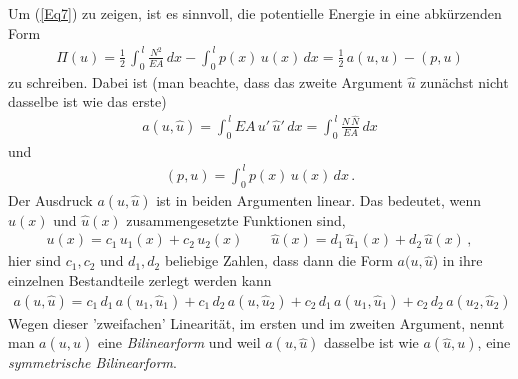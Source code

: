 Um (\ref{Eq7}) zu zeigen, ist es sinnvoll, die potentielle Energie in eine abk\"{u}rzenden Form
\begin{align}
\Pi(u) = \frac{1}{2}\, \int_0^{\,l} \frac{N^2}{EA}\,dx - \int_0^{\,l} p(x)\,u(x)\,dx = \frac{1}{2}\, a(u,u) - (p,u)
\end{align}
zu schreiben. Dabei ist (man beachte, dass das zweite Argument $\hat{u}$ zun\"{a}chst nicht dasselbe ist wie das erste)
\begin{align}
a(u,\hat{u}) = \int_0^{\,l} EA\,u'\,\hat{u}'\,dx = \int_0^{\,l} \frac{N\,\hat{N}}{EA}\,dx
\end{align}
und
\begin{align}
(p,u) = \int_0^{\,l} p(x)\,u(x)\,dx\,.
\end{align}
Der Ausdruck $a(u,\hat{u})$ ist in beiden Argumenten linear. Das bedeutet, wenn $ u(x) $ und $ \hat{u}(x)$ zusammengesetzte Funktionen sind,
\begin{align}
u(x)= c_1\,u_1(x) + c_2\,u_2(x) \qquad \hat{u}(x) = d_1\,\hat{u}_1(x) + d_2\,\hat{u}(x)\,,
\end{align}
hier sind $c_1, c_2$ und $d_1, d_2$  beliebige Zahlen, dass dann die Form $a(u,\hat{u}$) in ihre einzelnen Bestandteile zerlegt werden kann
\begin{align}
a(u,\hat{u}) = c_1\,d_1\,a(u_1,\hat{u}_1) + c_1\,d_2\,a(u,\hat{u}_2) + c_2\,d_1\,a(u_1,\hat{u}_1) + c_2\,d_2\,a(u_2,\hat{u}_2)
\end{align}
Wegen dieser 'zweifachen' Linearit\"{a}t, im ersten und im zweiten Argument, nennt man $ a(u,\hat{u}) $ eine {\em Bilinearform\/} und weil $a(u,\hat{u})$ dasselbe ist wie $a(\hat{u},u)$, eine
{\em symmetrische Bilinearform\/}.

